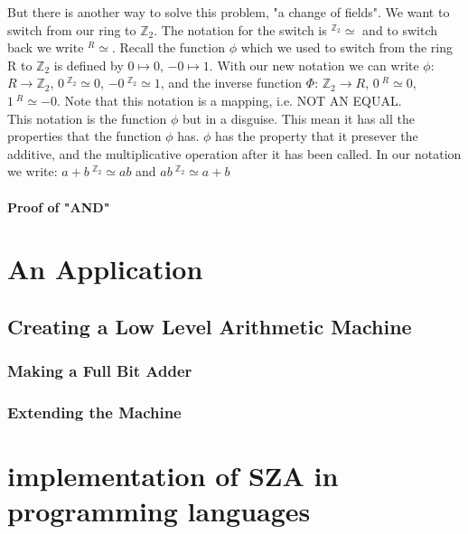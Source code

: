 \documentclass[12pt]{report}
\theoremstyle{definition}
\theoremstyle{remark}
\begin{document}
      But there is another way to solve this problem, "a change of fields". We want to switch from our ring to $\mathbb{Z}_2$. The notation for the switch is $^{\mathbb{Z}_2}\simeq$ and to switch back we write $^R\simeq$. Recall the function $\phi$ which we used to switch from the ring R to $\mathbb{Z}_2$ is defined by $0\mapsto 0$, $-0\mapsto 1$. With our new notation we can write $\phi$: $R\rightarrow \mathbb{Z}_2$, $0\ ^{\mathbb{Z}_2}\simeq 0$, $-0\ ^{\mathbb{Z}_2}\simeq 1$, and the inverse function $\Phi$: $\mathbb{Z}_2 \rightarrow R$, $0\ ^R\simeq 0$, $1\ ^R\simeq -0$. Note that this notation is a mapping, i.e. NOT AN EQUAL.\\

      This notation is the function $\phi$ but in a disguise. This mean it has all the properties that the function $\phi$ has. $\phi$ has the property that it presever the additive, and the multiplicative operation after it has been called. In our notation we write: $a+b\ ^{\mathbb{Z}_2}\simeq ab$ and $ab\ ^{\mathbb{Z}_2}\simeq a+b$
      \subsubsection{Proof of "AND"}

\newpage

\chapter{An Application}
  \section{Creating a Low Level Arithmetic Machine}
    \subsection{Making a Full Bit Adder}

    \subsection{Extending the Machine}

\newpage

\chapter{implementation of SZA in programming languages}
\end{document}
